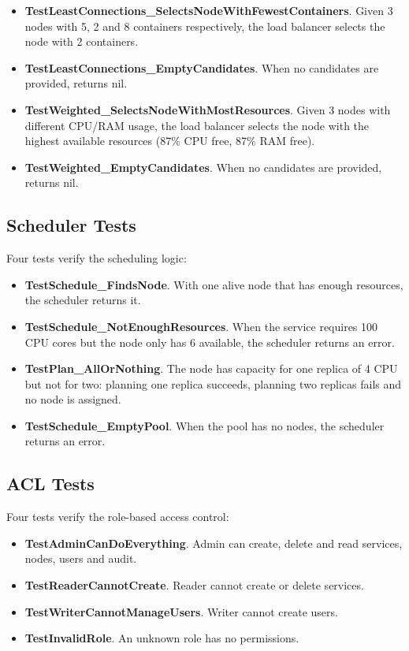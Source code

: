 \begin{itemize}
    \item \textbf{TestLeastConnections\_SelectsNodeWithFewestContainers}. Given 3 nodes with 5, 2 and 8 containers respectively, the load balancer selects the node with 2 containers.
    \item \textbf{TestLeastConnections\_EmptyCandidates}. When no candidates are provided, returns nil.
    \item \textbf{TestWeighted\_SelectsNodeWithMostResources}. Given 3 nodes with different CPU/RAM usage, the load balancer selects the node with the highest available resources (87\% CPU free, 87\% RAM free).
    \item \textbf{TestWeighted\_EmptyCandidates}. When no candidates are provided, returns nil.
\end{itemize}

\subsection{Scheduler Tests}

Four tests verify the scheduling logic:

\begin{itemize}
    \item \textbf{TestSchedule\_FindsNode}. With one alive node that has enough resources, the scheduler returns it.
    \item \textbf{TestSchedule\_NotEnoughResources}. When the service requires 100 CPU cores but the node only has 6 available, the scheduler returns an error.
    \item \textbf{TestPlan\_AllOrNothing}. The node has capacity for one replica of 4 CPU but not for two: planning one replica succeeds, planning two replicas fails and no node is assigned.
    \item \textbf{TestSchedule\_EmptyPool}. When the pool has no nodes, the scheduler returns an error.
\end{itemize}

\newpage
\subsection{ACL Tests}

Four tests verify the role-based access control:

\begin{itemize}
    \item \textbf{TestAdminCanDoEverything}. Admin can create, delete and read services, nodes, users and audit.
    \item \textbf{TestReaderCannotCreate}. Reader cannot create or delete services.
    \item \textbf{TestWriterCannotManageUsers}. Writer cannot create users.
    \item \textbf{TestInvalidRole}. An unknown role has no permissions.
\end{itemize}


